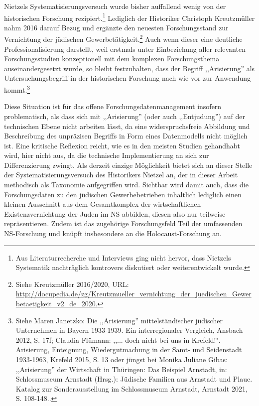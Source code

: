 Nietzels Systematisierungsversuch wurde bisher auffallend wenig von der historischen Forschung rezipiert.\footnote{Aus Literaturrecherche und Interviews ging nicht hervor, dass Nietzels Systematik nachträglich kontrovers diskutiert oder weiterentwickelt wurde.} Lediglich der Historiker Christoph Kreutzmüller nahm 2016 darauf Bezug und ergänzte den neuesten Forschungsstand zur Vernichtung der jüdischen Gewerbetätigkeit.\footnote{Siehe Kreutzmüller 2016/2020,  URL: \url{http://docupedia.de/zg/Kreutzmueller_vernichtung_der_juedischen_Gewerbetaetigkeit_v2_de_2020.}} Auch wenn dieser eine deutliche Professionalisierung darstellt, weil erstmals unter Einbeziehung aller relevanten Forschungsstudien konzeptionell mit dem komplexen Forschungsthema auseinandergesetzt wurde, so bleibt festzuhalten, dass der Begriff ,,Arisierung'' als Untersuchungsbegriff in der historischen Forschung nach wie vor zur Anwendung kommt.\footnote{Siehe Maren Janetzko: Die ,,Arisierung'' mittelständischer jüdischer Unternehmen in Bayern 1933-1939. Ein interregionaler Vergleich, Ansbach 2012, S. 17f; Claudia Flümann: ,,... doch nicht bei uns in Krefeld!". Arisierung, Enteignung, Wiedergutmachung in der Samt- und Seidenstadt 1933-1963, Krefeld 2015, S. 13 oder jüngst bei Monika Juliane Gibas: ,,Arisierung'' der Wirtschaft in Thüringen: Das Beispiel Arnstadt, in: Schlossmuseum Arnstadt (Hrsg.): Jüdische Familien aus Arnstadt und Plaue. Katalog zur Sonderausstellung im Schlossmuseum Arnstadt, Arnstadt 2021, S. 108-148..} 

Diese Situation ist für das offene Forschungsdatenmanagement insofern problematisch, als dass sich mit ,,Arisierung'' (oder auch ,,Entjudung'') auf der technischen Ebene nicht arbeiten lässt, da eine widerspruchsfreie Abbildung und Beschreibung des unpräzisen Begriffs in Form eines Datenmodells nicht möglich ist. Eine kritische Reflexion reicht, wie es in den meisten Studien gehandhabt wird, hier nicht aus, da die technische Implementierung an sich zur Differenzierung zwingt. Als derzeit einzige Möglichkeit bietet sich an dieser Stelle der Systematisierungsversuch des Historikers Nietzel an, der in dieser Arbeit methodisch als Taxonomie aufgegriffen wird. Sichtbar wird damit auch, dass die Forschungsdaten zu den jüdischen Gewerbebetrieben inhaltlich lediglich einen kleinen Ausschnitt aus dem Gesamtkomplex der wirtschaftlichen Existenzvernichtung der Juden im NS abbilden, diesen also nur teilweise repräsentieren. Zudem ist das zugehörige Forschungsfeld Teil der umfassenden NS-Forschung und knüpft insbesondere an die Holocaust-Forschung an.


